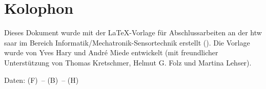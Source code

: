 \pagestyle{empty}

\hfill

\vfill


\section*{Kolophon}
Dieses Dokument wurde mit der \LaTeX-Vorlage für Abschlussarbeiten an der htw saar im Bereich Informatik/Mechatronik-Sensortechnik erstellt (\currentVersion). Die Vorlage wurde von Yves Hary und Andr\'e Miede entwickelt (mit freundlicher Unterstützung von Thomas Kretschmer, Helmut G. Folz und Martina Lehser).

Daten: (F)\makeatletter\f@size\makeatother\ -- (B)\the\textwidth\ -- (H)\the\textheight\ 


